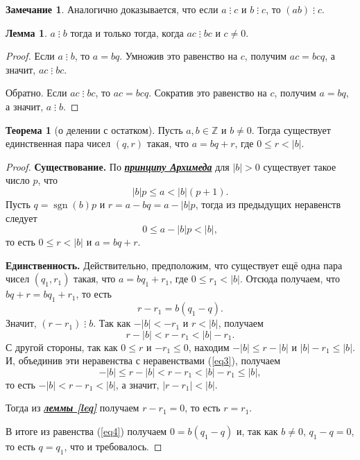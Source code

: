 \documentclass[14pt, a4paper]{extarticle}
\theoremstyle{definition}
\newtheorem{theorem}{Теорема}
\newtheorem{lemma}{Лемма}
\newtheorem*{remark}{Замечание}
\newcommand{\divisible}{\mathop{\vdots}}
\DeclareMathOperator{\sgn}{sgn}
\begin{document}
	\begin{remark}
		Аналогично доказывается, что если $a\divisible c$ и $b\divisible c$, то $(ab)\divisible c$.
	\end{remark}

	\begin{lemma}
	\label{sokr}
		$a\divisible b$ тогда и только тогда, когда $ac\divisible bc$ и $c\neq0$.
	\end{lemma}
	\begin{proof}
		Если $a\divisible b$, то $a=bq$. Умножив это равенство на $c$, получим $ac=bcq$, а значит, $ac\divisible bc$.
		
		Обратно. Если $ac\divisible bc$, то $ac=bcq$. Сократив это равенство на $c$, получим $a=bq$, а значит, $a\divisible b$.
	\end{proof}

	\begin{theorem}[о делении с остатком]
	\label{ost}
		Пусть $a,b\in\mathbb{Z}$ и $b\neq0$. Тогда существует единственная пара чисел $(q,r)$ такая, что $a=bq+r$, где $0\leqslant r<|b|$.
	\end{theorem}
	\begin{proof}
		\textbf{Существование.} По \href{https://ru.wikipedia.org/wiki/%D0%90%D0%BA%D1%81%D0%B8%D0%BE%D0%BC%D0%B0_%D0%90%D1%80%D1%85%D0%B8%D0%BC%D0%B5%D0%B4%D0%B0}{\textbf{\textit{принципу Архимеда}}} для $|b|>0$ существует такое число $p$, что $$|b|p\leqslant a<|b|(p+1).$$
		Пусть $q=\sgn(b)p$ и $r=a-bq=a-|b|p$, тогда из предыдущих неравенств следует $$0\leqslant a-|b|p<|b|,$$ то есть $0\leqslant r<|b|$ и $a=bq+r$.
		
		\textbf{Единственность.} Действительно, предположим, что существует ещё одна пара чисел $(q_1,r_1)$ такая, что $a=bq_1+r_1$, где $0\leqslant r_1<|b|$. Отсюда получаем, что $bq+r=bq_1+r_1$, то есть
		\begin{equation}
		\label{eq4}
			r-r_1=b(q_1-q).
		\end{equation}
		Значит, $(r-r_1)\divisible b$. Так как $-|b|<-r_1$ и $r<|b|$, получаем
		\begin{equation}
		\label{eq3}
			r-|b|<r-r_1<|b|-r_1.
		\end{equation}
		С другой стороны, так как $0\leqslant r$ и $-r_1\leqslant0$, находим $-|b|\leqslant r-|b|$ и $|b|-r_1\leqslant |b|$. И, объединив эти неравенства с неравенствами (\ref{eq3}), получаем $$-|b|\leqslant r-|b|<r-r_1<|b|-r_1\leqslant |b|,$$ то есть $-|b|<r-r_1<|b|$, а значит, $|r-r_1|<|b|$.

		Тогда из \hyperref[leq]{\textbf{\textit{леммы \ref*{leq}}}} получаем $r-r_1=0$, то есть $r=r_1$.
		
		В итоге из равенства (\ref{eq4}) получаем $0=b(q_1-q)$ и, так как $b\neq0$, $q_1-q=0$, то есть $q=q_1$, что и требовалось.
	\end{proof}
\end{document}
